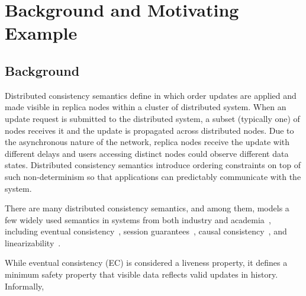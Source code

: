 \section{Background and Motivating Example}
\label{sec:background}

\subsection{Background}
Distributed consistency semantics define in which order updates are
applied and made visible in replica nodes within a cluster of
distributed system.
When an update request is submitted to the distributed system, a
subset (typically one) of nodes receives it and the update is
propagated across distributed nodes. Due to the asynchronous nature
of the network, replica nodes receive the update with
different delays and users accessing distinct nodes could observe
different data states. Distributed consistency semantics introduce
ordering constraints on top of such non-determinism so that
applications can predictably communicate with the system.

There are many distributed consistency semantics, and among them,
\sysname{} models a few widely used semantics in systems from both
industry and academia~\cite{pileus, cosmosdb, anna, bayou, yogurt,
pnuts, cloudflare-session, causalmemory, cops}, including eventual
consistency~\cite{burckhardt2014principles}, session
guarantees~\cite{terry1994session}, causal
consistency~\cite{causaldef}, and
linearizability~\cite{herlihy1990linearizability}.

While eventual consistency (EC) is considered a liveness property,
it defines a minimum safety property that visible data reflects valid
updates in history. Informally,

